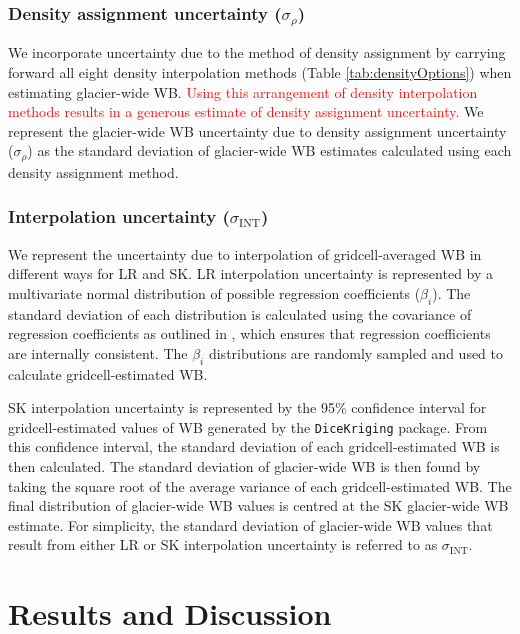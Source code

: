 \documentclass[twocolumn, letterpaper]{igs}
\begin{document}
	\subsubsection{Density assignment uncertainty ($\sigma_{\rho}$)}
We incorporate uncertainty due to the method of density assignment by carrying forward all eight density interpolation methods (Table \ref{tab:densityOptions}) when estimating glacier-wide WB. \textcolor{red}{Using this arrangement of density interpolation methods results in a generous estimate of density assignment uncertainty.} We represent the glacier-wide WB uncertainty due to density assignment uncertainty ($\sigma_{\rho}$) as the standard deviation of glacier-wide WB estimates calculated using each density assignment method.

	\subsubsection{Interpolation uncertainty ($\sigma_{\mathrm{INT}}$)}
We represent the uncertainty due to interpolation of gridcell-averaged WB in different ways for LR and SK. LR interpolation uncertainty is represented by a multivariate normal distribution of possible regression coefficients ($\beta_i$). The standard deviation of each distribution is calculated using the covariance of regression coefficients as outlined in \cite{Bagos2015}, which ensures that regression coefficients are internally consistent. The $\beta_i$ distributions are randomly sampled and used to calculate gridcell-estimated WB.

SK interpolation uncertainty is represented by the 95\% confidence interval for gridcell-estimated values of WB generated by the \texttt{DiceKriging} package. From this confidence interval, the standard deviation of each gridcell-estimated WB is then calculated. The standard deviation of glacier-wide WB is then found by taking the square root of the average variance of each gridcell-estimated WB. The final distribution of glacier-wide WB values is centred at the SK glacier-wide WB estimate. For simplicity, the standard deviation of glacier-wide WB values that result from either LR or SK interpolation uncertainty is referred to as $\sigma_{\mathrm{INT}}$.



\section{Results and Discussion}
\end{document}
